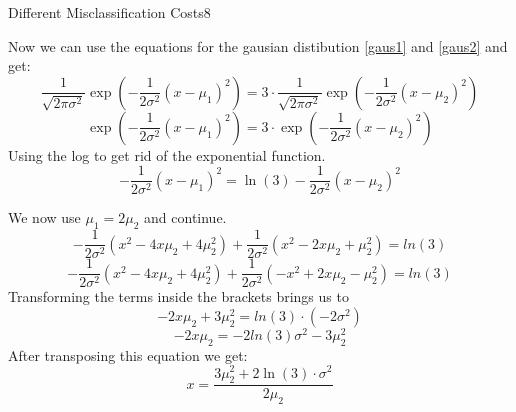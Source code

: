 \begin{questions}
\begin{question}{Different Misclassification Costs}{8}
\begin{answer}
Now we can use the equations for the gausian distibution \ref{gaus1} and \ref{gaus2} and get:
\begin{equation}
	\frac{1}{\sqrt{2\pi\sigma^2}} \exp(-\frac{1}{2\sigma^2}(x-\mu_1)^2) = 3\cdot \frac{1}{\sqrt{2\pi\sigma^2}} \exp(-\frac{1}{2\sigma^2}(x-\mu_2)^2)
\end{equation}
\begin{equation}
 \exp(-\frac{1}{2\sigma^2}(x-\mu_1)^2) = 3\cdot  \exp(-\frac{1}{2\sigma^2}(x-\mu_2)^2)
\end{equation}
Using the log to get rid of the exponential function.
\begin{equation}
	 -\frac{1}{2\sigma^2}(x-\mu_1)^2 = \ln(3)  -\frac{1}{2\sigma^2}(x-\mu_2)^2
\end{equation}

We now use $\mu_1 = 2 \mu_2$ and continue.
\begin{equation}
	-\frac{1}{2\sigma^2}(x^2-4x\mu_2 + 4\mu_2^2) + \frac{1}{2\sigma^2}(x^2-2x\mu_2+\mu_2^2) = ln(3)
\end{equation}
\begin{equation}
	-\frac{1}{2\sigma^2}(x^2 -4x\mu_2+4\mu_2^2) + \frac{1}{2\sigma^2}(-x^2+2x\mu_2-\mu_2^2) = ln(3)
\end{equation}
Transforming the terms inside the brackets brings us to
\begin{equation}
	-2x\mu_2 + 3\mu_2^2 = ln(3)\cdot(-2\sigma^2)
\end{equation}
\begin{equation}
	-2x\mu_2 = -2ln(3)\sigma^2 - 3\mu_2^2
\end{equation}
After transposing this equation we get:
\begin{equation}
	x = \frac{3\mu_2^2 + 2\ln(3)\cdot\sigma^2}{2\mu_2}
\end{equation}

\end{answer}

\end{question}


\end{questions}
